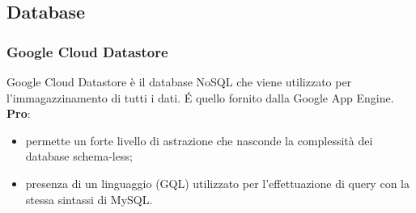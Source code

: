 
	\subsection{Database} %
	\label{sub:database}

		\subsubsection{Google Cloud Datastore} %
		\label{ssub:datastore}
		Google Cloud Datastore è il database NoSQL che viene utilizzato per l'immagazzinamento di tutti i dati. \'E quello fornito dalla Google App Engine. \newline
		\textbf{Pro}:
			\begin{itemize}
				\item permette un forte livello di astrazione che nasconde la complessità dei database schema-less;
				\item presenza di un linguaggio (GQL) utilizzato per l'effettuazione di query con la stessa sintassi di MySQL.
			\end{itemize}


